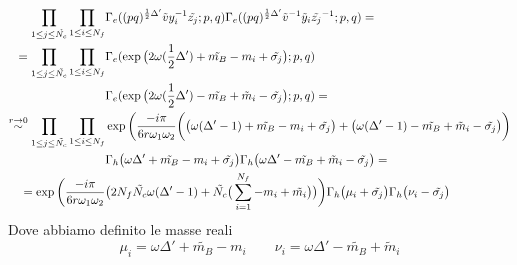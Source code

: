 \documentclass[a4paper,12pt]{article}
\begin{document}
\begin{align*}
 \prod_{ 1 \leq j \leq \tilde{N_c}} \prod_{ 1 \leq i \leq N_f} & \Gamma_e ( (pq)^{{1 \over 2 } \Delta'} \tilde{v} y_i^{-1} \tilde{z_j} ; p,q)\Gamma_e ( (pq)^{{1 \over 2 } \Delta'} \tilde{v}^{-1} \tilde y_i \tilde{z_j}^{-1} ; p,q)  = \\
 = \prod_{ 1 \leq j \leq \tilde{N_c}} \prod_{ 1 \leq i \leq N_f}  & \Gamma_e ( \exp\big( 2 \omega( {1 \over 2 } \Delta')   + \tilde{m_B} - m_i  + \tilde{\sigma_j} \big) ; p,q) \\
 &\Gamma_e ( \exp\big( 2 \omega(  {1 \over 2 } \Delta' )  - \tilde{m_B} + \tilde  m_i  - \tilde{\sigma_j} \big) ; p,q)  = \\
 \overset{ r \rightarrow 0 } { \sim } \prod_{ 1 \leq j \leq \tilde{N_c}} \prod_{ 1 \leq i \leq N_f}   &\exp \bigg( \frac{- i \pi }{6 r \omega_1 \omega_2} \bigg(  \big(\omega ( \Delta' - 1) + \tilde{m_B} - m_i  + \tilde{\sigma_j} \big)  +  \big( \omega (  \Delta' - 1) - \tilde{m_B} + \tilde m_i  - \tilde{\sigma_j}  \big)\bigg) \\
&\Gamma_h \big(\omega \Delta' + \tilde{m_B} - m_i  + \tilde{\sigma_j} \big) \Gamma_h \big(\omega \Delta' - \tilde{m_B} +  \tilde m_i  - \tilde{\sigma_j} \big)  = \\
 =   \exp \bigg( \frac{- i \pi }{6 r \omega_1 \omega_2} &\big( 2  N_f \tilde{N_c}\omega (\Delta' - 1 ) +  \tilde{N_c} \big( \sum_{i=1}^{N_f} - m_i + \tilde{m_i} \big)  \big) \bigg)  \Gamma_h \big( \mu_i + \tilde{\sigma_j} \big) \Gamma_h \big(\nu_i - \tilde{\sigma_j} \big)  
\end{align*}
Dove abbiamo definito le masse reali 
$$
 \mu_i = \omega \Delta' + \tilde{m_B} - m_i   \qquad \nu_i  = \omega \Delta' - \tilde{m_B} +  \tilde m_i 
$$
\end{document}
